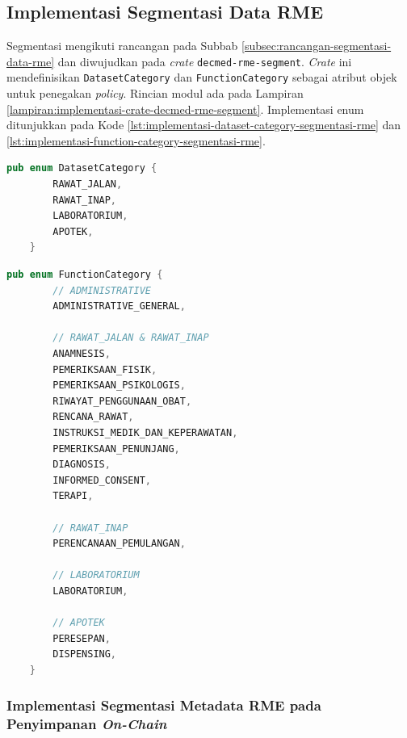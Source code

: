 \subsection{Implementasi Segmentasi Data RME}
\label{subsec:implementasi-segmentasi-data-rme}


Segmentasi mengikuti rancangan pada Subbab \ref{subsec:rancangan-segmentasi-data-rme} dan diwujudkan pada \textit{crate} \texttt{decmed-rme-segment}. \textit{Crate} ini mendefinisikan \texttt{DatasetCategory} dan \texttt{FunctionCategory} sebagai atribut objek untuk penegakan \textit{policy}. Rincian modul ada pada Lampiran \ref{lampiran:implementasi-crate-decmed-rme-segment}. Implementasi enum ditunjukkan pada Kode \ref{lst:implementasi-dataset-category-segmentasi-rme} dan \ref{lst:implementasi-function-category-segmentasi-rme}.

\begin{lstlisting}[language=Rust, caption=Implementasi \texttt{DatasetCategory} pada \textit{crate} \texttt{decmed-rme-segment}, label={lst:implementasi-dataset-category-segmentasi-rme}]
	pub enum DatasetCategory {
		RAWAT_JALAN,
		RAWAT_INAP,
		LABORATORIUM,
		APOTEK,
	}
\end{lstlisting}

\begin{lstlisting}[language=Rust, caption=Implementasi \texttt{FunctionCategory} pada \textit{crate} \texttt{decmed-rme-segment}, label={lst:implementasi-function-category-segmentasi-rme}]
	pub enum FunctionCategory {
		// ADMINISTRATIVE
		ADMINISTRATIVE_GENERAL,
	
		// RAWAT_JALAN & RAWAT_INAP
		ANAMNESIS,
		PEMERIKSAAN_FISIK,
		PEMERIKSAAN_PSIKOLOGIS,
		RIWAYAT_PENGGUNAAN_OBAT,
		RENCANA_RAWAT,
		INSTRUKSI_MEDIK_DAN_KEPERAWATAN,
		PEMERIKSAAN_PENUNJANG,
		DIAGNOSIS,
		INFORMED_CONSENT,
		TERAPI,
	
		// RAWAT_INAP
		PERENCANAAN_PEMULANGAN,
	
		// LABORATORIUM
		LABORATORIUM,
	
		// APOTEK
		PERESEPAN,
		DISPENSING,
	}
\end{lstlisting}

\subsubsection{Implementasi Segmentasi Metadata RME pada Penyimpanan \textit{On-Chain}}
\label{subsec:implementasi-segmentasi-metadata-rme-onchain}

